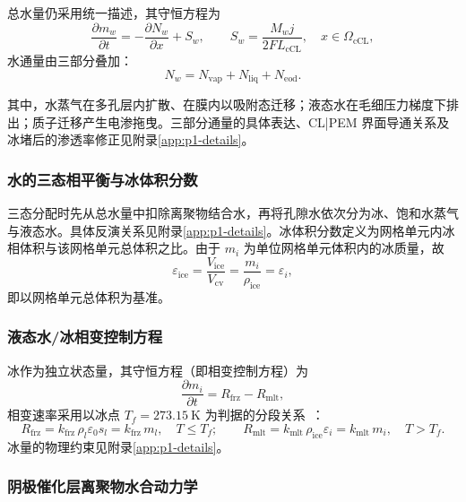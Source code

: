 \documentclass{gmcmthesis}
\begin{document}
总水量仍采用统一描述，其守恒方程为
\begin{equation}
  \frac{\partial m_w}{\partial t}=-\frac{\partial N_w}{\partial x}+S_w,
  \qquad
  S_w=\frac{M_w j}{2FL_{\mathrm{cCL}}},\quad x\in\Omega_{\mathrm{cCL}},
  \label{eq:water}
\end{equation}
水通量由三部分叠加：
\begin{equation}
  N_w=N_{\mathrm{vap}}+N_{\mathrm{liq}}+N_{\mathrm{eod}}.
  \label{eq:nw}
\end{equation}

其中，水蒸气在多孔层内扩散、在膜内以吸附态迁移；液态水在毛细压力梯度下排出；质子迁移产生电渗拖曳。三部分通量的具体表达、CL|PEM 界面导通关系及冰堵后的渗透率修正见附录\ref{app:p1-details}。

\subsubsection{水的三态相平衡与冰体积分数}

三态分配时先从总水量中扣除离聚物结合水，再将孔隙水依次分为冰、饱和水蒸气与液态水。具体反演关系见附录\ref{app:p1-details}。冰体积分数定义为网格单元内冰相体积与该网格单元总体积之比。由于 $m_i$ 为单位网格单元体积内的冰质量，故
\begin{equation}
  \varepsilon_{\mathrm{ice}}=\frac{V_{\mathrm{ice}}}{V_{\mathrm{cv}}}
  =\frac{m_i}{\rho_{\mathrm{ice}}}=\varepsilon_i,
  \label{eq:icevf}
\end{equation}
即以网格单元总体积为基准。

\subsubsection{液态水/冰相变控制方程}

冰作为独立状态量，其守恒方程（即相变控制方程）为
\begin{equation}
  \frac{\partial m_i}{\partial t}=R_{\mathrm{frz}}-R_{\mathrm{mlt}},
  \label{eq:iceeq}
\end{equation}
相变速率采用以冰点 $T_f=273.15~\mathrm{K}$ 为判据的分段关系~\cite{mao2007multiphase}：
\begin{equation}
  R_{\mathrm{frz}}=k_{\mathrm{frz}}\,\rho_l\varepsilon_0 s_l=k_{\mathrm{frz}}\,m_l,
  \quad T\le T_f;
  \qquad
  R_{\mathrm{mlt}}=k_{\mathrm{mlt}}\,\rho_{\mathrm{ice}}\varepsilon_i=k_{\mathrm{mlt}}\,m_i,
  \quad T>T_f.
  \label{eq:phase}
\end{equation}
冰量的物理约束见附录\ref{app:p1-details}。

\subsubsection{阴极催化层离聚物水合动力学}
\end{document}
